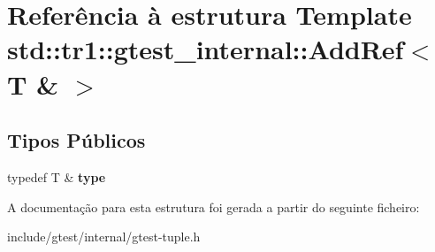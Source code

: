 \hypertarget{structstd_1_1tr1_1_1gtest__internal_1_1AddRef_3_01T_01_6_01_4}{\section{Referência à estrutura Template std\-:\-:tr1\-:\-:gtest\-\_\-internal\-:\-:Add\-Ref$<$ T \& $>$}
\label{structstd_1_1tr1_1_1gtest__internal_1_1AddRef_3_01T_01_6_01_4}
}
\subsection*{Tipos Públicos}
\begin{DoxyCompactItemize}
\item 
\hypertarget{structstd_1_1tr1_1_1gtest__internal_1_1AddRef_3_01T_01_6_01_4_a9cb3b0992c2a9e7df42d01fb64c2dc88}{typedef T \& {\bfseries type}}\label{structstd_1_1tr1_1_1gtest__internal_1_1AddRef_3_01T_01_6_01_4_a9cb3b0992c2a9e7df42d01fb64c2dc88}

\end{DoxyCompactItemize}


A documentação para esta estrutura foi gerada a partir do seguinte ficheiro\-:\begin{DoxyCompactItemize}
\item 
include/gtest/internal/gtest-\/tuple.\-h\end{DoxyCompactItemize}
